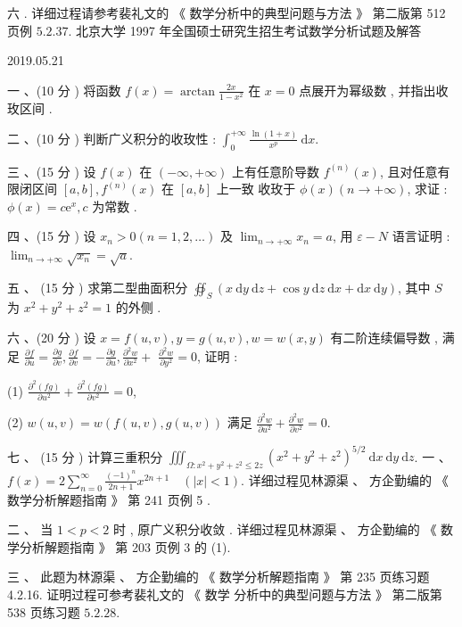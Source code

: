 \documentclass[10pt]{article}
\begin{document}
 六 .  详细过程请参考裴礼文的 《 数学分析中的典型问题与方法 》 第二版第  512  页例  $5.2 .37$.  北京大学  1997  年全国硕士研究生招生考试数学分析试题及解答 

   

2019.05.21

 一 、(10  分 )  将函数  $f(x)=\arctan \frac{2 x}{1-x^{2}}$  在  $x=0$  点展开为幂级数 ,  并指出收玫区间 .

 二 、(10  分 )  判断广义积分的收玫性 : $\int_{0}^{+\infty} \frac{\ln (1+x)}{x^{p}} \mathrm{~d} x$.

 三 、(15  分 )  设  $f(x)$  在  $(-\infty,+\infty)$  上有任意阶导数  $f^{(n)}(x)$,  且对任意有限闭区间  $[a, b], f^{(n)}(x)$  在  $[a, b]$  上一致   收玫于  $\phi(x)(n \rightarrow+\infty)$,  求证 : $\phi(x)=c \mathrm{e}^{x}, c$  为常数 .

 四 、(15  分 )  设  $x_{n}>0(n=1,2, \ldots)$  及  $\lim _{n \rightarrow+\infty} x_{n}=a$,  用  $\varepsilon-N$  语言证明 : $\lim _{n \rightarrow+\infty} \sqrt{x_{n}}=\sqrt{a}$.

 五 、 (15  分 )  求第二型曲面积分  $\oiint_{S}(x \mathrm{~d} y \mathrm{~d} z+\cos y \mathrm{~d} z \mathrm{~d} x+\mathrm{d} x \mathrm{~d} y)$,  其中  $S$  为  $x^{2}+y^{2}+z^{2}=1$  的外侧 .

 六 、(20  分 )  设  $x=f(u, v), y=g(u, v), w=w(x, y)$  有二阶连续偏导数 ,  满足  $\frac{\partial f}{\partial u}=\frac{\partial g}{\partial v}, \frac{\partial f}{\partial v}=-\frac{\partial g}{\partial u}, \frac{\partial^{2} w}{\partial x^{2}}+$ $\frac{\partial^{2} w}{\partial y^{2}}=0$,  证明 :

(1) $\frac{\partial^{2}(f g)}{\partial u^{2}}+\frac{\partial^{2}(f g)}{\partial v^{2}}=0$,

(2) $w(u, v)=w(f(u, v), g(u, v))$  满足  $\frac{\partial^{2} w}{\partial u^{2}}+\frac{\partial^{2} w}{\partial v^{2}}=0$.

 七 、 (15  分 )  计算三重积分  $\iiint_{\Omega: x^{2}+y^{2}+z^{2} \leq 2 z}\left(x^{2}+y^{2}+z^{2}\right)^{5 / 2} \mathrm{~d} x \mathrm{~d} y \mathrm{~d} z$.  一 、 $f(x)=2 \sum_{n=0}^{\infty} \frac{(-1)^{n}}{2 n+1} x^{2 n+1} \quad(|x|<1)$.  详细过程见林源渠 、 方企勤编的 《 数学分析解题指南 》 第  241  页例  5 .

 二 、 当  $1<p<2$  时 ,  原广义积分收敛 .  详细过程见林源渠 、 方企勤编的 《 数学分析解题指南 》 第  203  页例  3  的  (1).

 三 、 此题为林源渠 、 方企勤编的 《 数学分析解题指南 》 第  235  页练习题  4.2.16.  证明过程可参考裴礼文的 《 数学   分析中的典型问题与方法 》 第二版第  538  页练习题  $5.2 .28$.
\end{document}

